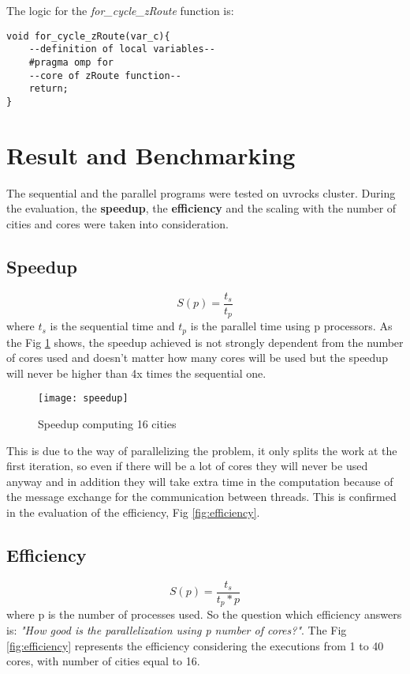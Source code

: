 \documentclass[11pt,conference]{IEEEtran}
\begin{document}
The logic for the \textit{for\_cycle\_zRoute} function is:

\begin{lstlisting}
void for_cycle_zRoute(var_c){
    --definition of local variables--
    #pragma omp for
    --core of zRoute function--
    return;
}
\end{lstlisting}
\fi
\section{Result and Benchmarking}
\iffalse
The sequential and the parallel programs were tested on uvrocks cluster. During the evaluation, the \textbf{speedup}, the \textbf{efficiency} and the scaling with the number of cities and cores were taken into consideration.
\newline

\subsection{Speedup}
\[ S(p) = \dfrac{t_s}{t_p}  \]
where $t_s$ is the sequential time and $t_p$ is the parallel time using p processors. As the Fig \ref{fig:speedup} shows, the speedup achieved is not strongly dependent from the number of cores used and doesn't matter how many cores will be used but the speedup will never be higher than 4x times the sequential one.

\begin{figure}[h!]
  \centering
    \texttt{[image: speedup]}
    \caption{Speedup computing 16 cities}
    \label{fig:speedup}
\end{figure}

This is due to the way of parallelizing the problem, it only splits the work at the first iteration, so even if there will be a lot of cores they will never be used anyway and in addition they will take extra time in the computation because of the message exchange for the communication between threads. This is confirmed in the evaluation of the efficiency, Fig \ref{fig:efficiency}.
 
\subsection{Efficiency}
\[ S(p) = \dfrac{t_s}{t_p * p}  \]
where p is the number of processes used. So the question which efficiency answers is: \textit{"How good is the parallelization using p number of cores?"}. The Fig \ref{fig:efficiency} represents the efficiency considering the executions from 1 to 40 cores, with number of cities equal to 16.
\end{document}
